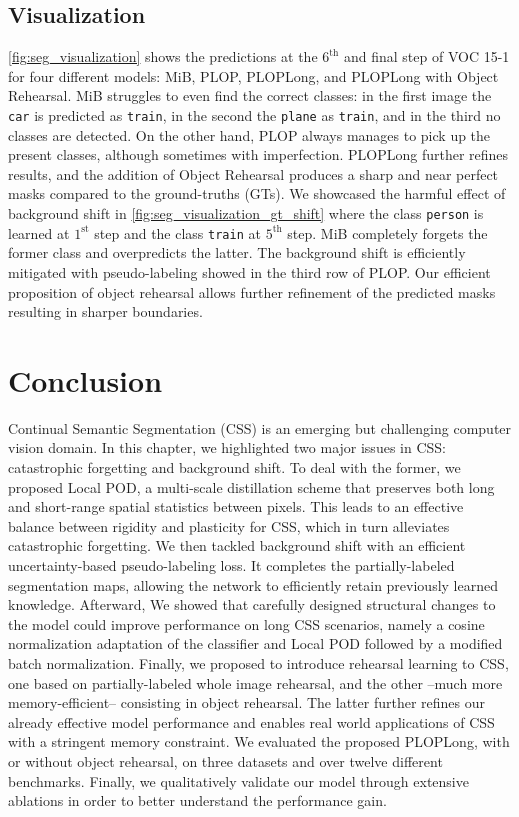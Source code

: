\subsection{Visualization}

\autoref{fig:seg_visualization} shows the predictions at the $6^\text{th}$ and final step of VOC
15-1 for four different models: MiB, PLOP, PLOPLong, and PLOPLong with Object Rehearsal. MiB
struggles to even find the correct classes: in the first image the \texttt{car} is predicted as
\texttt{train}, in the second the \texttt{plane} as \texttt{train}, and in the third no classes are
detected. On the other hand, PLOP always manages to pick up the present classes, although sometimes
with imperfection. PLOPLong further refines results, and the addition of Object Rehearsal produces a
sharp and near perfect masks compared to the ground-truths (GTs). We showcased the harmful effect of
background shift in \autoref{fig:seg_visualization_gt_shift} where the class \texttt{person} is
learned at $1^\text{st}$ step and the class \texttt{train} at $5^\text{th}$ step. MiB completely
forgets the former class and overpredicts the latter. The background shift is efficiently mitigated
with pseudo-labeling showed in the third row of PLOP. Our efficient proposition of object rehearsal
allows further refinement of the predicted masks resulting in sharper boundaries.

\section{Conclusion}
\label{sec:seg_conclusion}

Continual Semantic Segmentation (\ac{CSS}) is an emerging but challenging computer vision domain. In
this chapter, we highlighted two major issues in \ac{CSS}: catastrophic forgetting and background
shift. To deal with the former, we proposed Local POD, a multi-scale distillation scheme that
preserves both long and short-range spatial statistics between pixels. This leads to an effective
balance between rigidity and plasticity for \ac{CSS}, which in turn alleviates catastrophic
forgetting. We then tackled background shift with an efficient uncertainty-based pseudo-labeling
loss. It completes the partially-labeled segmentation maps, allowing the network to efficiently
retain previously learned knowledge. Afterward, We showed that carefully designed structural changes
to the model could improve performance on long \ac{CSS} scenarios, namely a cosine normalization
adaptation of the classifier and Local POD followed by a modified batch normalization. Finally, we
proposed to introduce rehearsal learning to \ac{CSS}, one based on partially-labeled whole image
rehearsal, and the other --much more memory-efficient-- consisting in object rehearsal. The latter
further refines our already effective model performance and enables real world applications of
\ac{CSS} with a stringent memory constraint. We evaluated the proposed PLOPLong, with or without
object rehearsal, on three datasets and over twelve different benchmarks. Finally, we qualitatively
validate our model through extensive ablations in order to better understand the performance gain.
